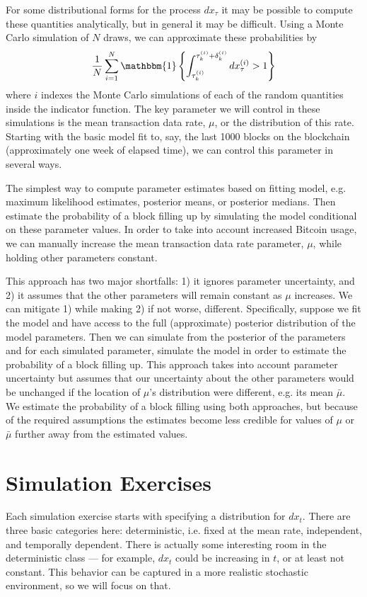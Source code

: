 \documentclass{article}
\begin{document}
For some distributional forms for the process $dx_\tau$ it may be possible to compute these quantities analytically, but in general it may be difficult. Using a Monte Carlo simulation of $N$ draws, we can approximate these probabilities by
\[
\frac{1}{N}\sum_{i=1}^N\mathbbm{1}\left\{\int_{\tau_k^{(i)}}^{\tau_{k}^{(i)}+\delta_k^{(i)}}dx_\tau^{(i)} > 1\right\}
\]
where $i$ indexes the Monte Carlo simulations of each of the random quantities inside the indicator function. The key parameter we will control in these simulations is the mean transaction data rate, $\mu$, or the distribution of this rate. Starting with the basic model fit to, say, the last 1000 blocks on the blockchain (approximately one week of elapsed time), we can control this parameter in several ways.

The simplest way to compute parameter estimates based on fitting model, e.g. maximum likelihood estimates, posterior means, or posterior medians. Then estimate the probability of a block filling up by simulating the model conditional on these parameter values. In order to take into account increased Bitcoin usage, we can manually increase the mean transaction data rate parameter, $\mu$, while holding other parameters constant. 

This approach has two major shortfalls: 1) it ignores parameter uncertainty, and 2) it assumes that the other parameters will remain constant as $\mu$ increases. We can mitigate 1) while making 2) if not worse, different. Specifically, suppose we fit the model and have access to the full (approximate) posterior distribution of the model parameters. Then we can simulate from the posterior of the parameters and for each simulated parameter, simulate the model in order to estimate the probability of a block filling up. This approach takes into account parameter uncertainty but assumes that our uncertainty about the other parameters would be unchanged if the location of $\mu$'s distribution were different, e.g. its mean $\bar{\mu}$. We estimate the probability of a block filling using both approaches, but because of the required assumptions the estimates become less credible for values of $\mu$ or $\bar{\mu}$ further away from the estimated values.

\section{Simulation Exercises}

Each simulation exercise starts with specifying a distribution for $dx_t$. There are three basic categories here: deterministic, i.e. fixed at the mean rate, independent, and temporally dependent. There is actually some interesting room in the deterministic class --- for example, $dx_t$ could be increasing in $t$, or at least not constant. This behavior can be captured in a more realistic stochastic environment, so we will focus on that. 
\end{document}
